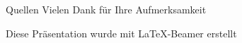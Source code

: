 \documentclass[handout,svgnames]{beamer}
\newcommand{\mcc}[2]{\multicolumn{#1}{|c|}{#2}} %
\begin{document}
\section{}%
\begin{frame}{Quellen}
	Vielen Dank für Ihre Aufmerksamkeit
	
	\medskip Diese Präsentation wurde mit \LaTeX{}-Beamer erstellt
\end{frame}




\end{document}
